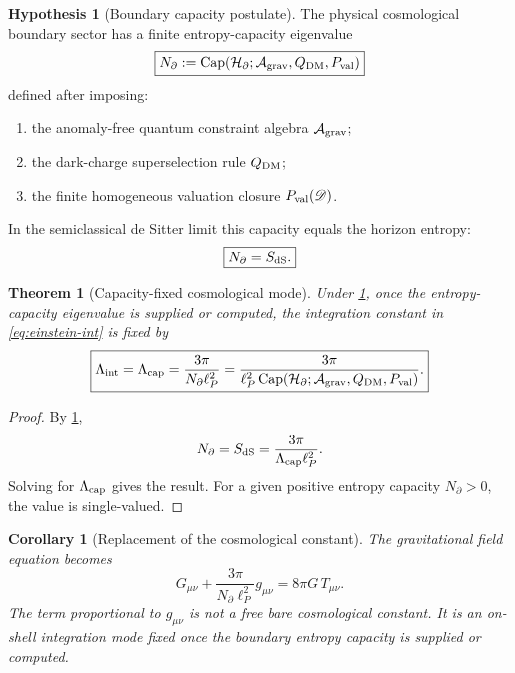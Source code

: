 \documentclass[aps,prd,reprint,nofootinbib,superscriptaddress]{revtex4-2}
\numberwithin{equation}{section}
\theoremstyle{definition}
\newtheorem{hypothesis}{Hypothesis}[section]
\theoremstyle{plain}
\newtheorem{theorem}{Theorem}[section]
\newtheorem{corollary}{Corollary}[section]
\newcommand{\Dil}{\mathscr D}
\newcommand{\Agrav}{\mathcal A_{\rm grav}}
\newcommand{\Ncap}{N_{\partial}}
\newcommand{\Capacity}{\operatorname{Cap}}
\begin{document}
\begin{hypothesis}[Boundary capacity postulate]\label{hyp:capacity}
The physical cosmological boundary sector has a finite entropy-capacity eigenvalue
\begin{equation}
\boxed{
\Ncap
:=
\Capacity(\mathcal H_\partial;\Agrav,Q_{\rm DM},P_{\rm val})
}
\end{equation}
defined after imposing:
\begin{enumerate}
\item the anomaly-free quantum constraint algebra \(\Agrav\);
\item the dark-charge superselection rule \(Q_{\rm DM}\);
\item the finite homogeneous valuation closure \(P_{\rm val}(\Dil)\).
\end{enumerate}
In the semiclassical de Sitter limit this capacity equals the horizon entropy:
\begin{equation}
\boxed{
\Ncap=S_{\rm dS}.
}
\end{equation}
\end{hypothesis}

\begin{theorem}[Capacity-fixed cosmological mode]\label{thm:capacity-mode}
Under \cref{hyp:capacity}, once the entropy-capacity eigenvalue is supplied or computed, the integration constant in \eqref{eq:einstein-int} is fixed by
\begin{equation}
\boxed{
\Lambda_{\rm int}=\Lambda_{\rm cap}
=
\frac{3\pi}{\Ncap\ell_P^2}
=
\frac{3\pi}
{\ell_P^2\Capacity(\mathcal H_\partial;\Agrav,Q_{\rm DM},P_{\rm val})}.
}
\end{equation}
\end{theorem}

\begin{proof}
By \cref{hyp:capacity},
\[
\Ncap=S_{\rm dS}=\frac{3\pi}{\Lambda_{\rm cap}\ell_P^2}.
\]
Solving for \(\Lambda_{\rm cap}\) gives the result.  For a given positive entropy capacity \(\Ncap>0\), the value is single-valued.
\end{proof}

\begin{corollary}[Replacement of the cosmological constant]\label{cor:lambda-replacement}
The gravitational field equation becomes
\begin{equation}
\boxed{
G_{\mu\nu}
+
\frac{3\pi}{\Ncap\ell_P^2}g_{\mu\nu}
=
8\pi G\,T_{\mu\nu}.
}
\label{eq:capacity-einstein}
\end{equation}
The term proportional to \(g_{\mu\nu}\) is not a free bare cosmological constant.  It is an on-shell integration mode fixed once the boundary entropy capacity is supplied or computed.
\end{corollary}
\end{document}
